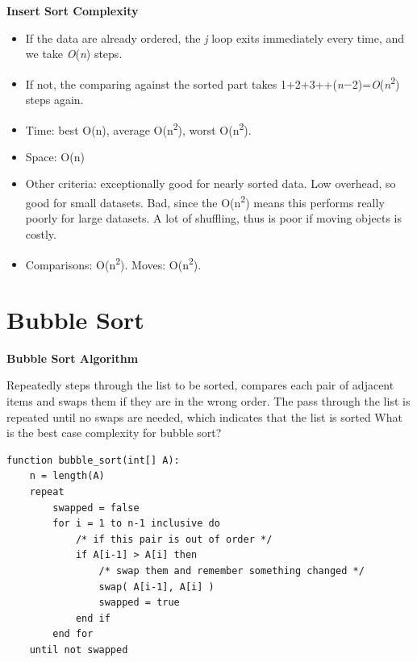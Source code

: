 \documentclass{beamer}
\begin{document}
\begin{frame}
\begin{center}
\textbf{Insert Sort Complexity}
\end{center}
\begin{itemize}
\item If the data are already ordered, the \textit{j }loop exits immediately every time, and we take
\textit{O}(\textit{n}) steps.
\item If not, the comparing against the sorted part takes
1+2+3+{\textperiodcentered}{\textperiodcentered}{\textperiodcentered}+(\textit{n}$-$2)=\textit{O}(\textit{n}\textsuperscript{2})
steps again.
\item Time: best O(n), average O(n\textsuperscript{2}), worst O(n\textsuperscript{2}). 
\item Space: O(n)
\item Other criteria: exceptionally good for nearly sorted data. Low overhead, so good for small datasets. Bad, since
the O(n\textsuperscript{2}) means this performs really poorly for large datasets. A lot of shuffling, thus is poor if moving objects is
costly.
\item Comparisons: O(n\textsuperscript{2}). Moves: O(n\textsuperscript{2}).
\end{itemize} 

\end{frame} 

\section{Bubble Sort}
\begin{frame}
\begin{center}
\textbf{Bubble Sort Algorithm}
\end{center}
Repeatedly steps through the list to be sorted, compares each pair of adjacent items and swaps them if they are in the wrong order. The pass through the list is repeated until no swaps are needed, which indicates that the list is sorted\newline\newline
What is the best case complexity for bubble sort?
\end{frame} 

\begin{frame}[fragile]
\begin{block}{}
\begin{lstlisting}
function bubble_sort(int[] A): 
    n = length(A)
    repeat 
        swapped = false
        for i = 1 to n-1 inclusive do
            /* if this pair is out of order */
            if A[i-1] > A[i] then
                /* swap them and remember something changed */
                swap( A[i-1], A[i] )
                swapped = true
            end if
        end for
    until not swapped

\end{lstlisting}
\end{block}
\end{frame}
\end{document}
